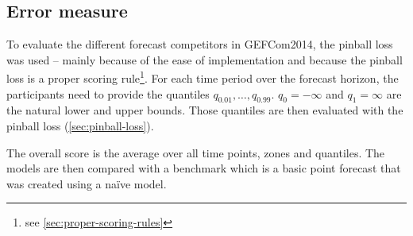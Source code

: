 \subsection{Error measure}

To evaluate the different forecast competitors in GEFCom2014, 
the pinball loss was used -- mainly because of the ease of implementation 
and because the pinball loss is a proper scoring rule\footnote{see \ref{sec:proper-scoring-rules}}. 
For each time period over the forecast horizon, the participants need to 
provide the quantiles \(q_{0.01}, \ldots, q_{0.99}\). 
\(q_0 = -\infty\) and \(q_1 = \infty\) are the natural lower and upper bounds. 
Those quantiles are then evaluated with the pinball loss (\ref{sec:pinball-loss}).

The overall score is the average over all time points, zones and quantiles.
The models are then compared with a benchmark which is a basic point forecast 
that was created using a na\"{i}ve model.